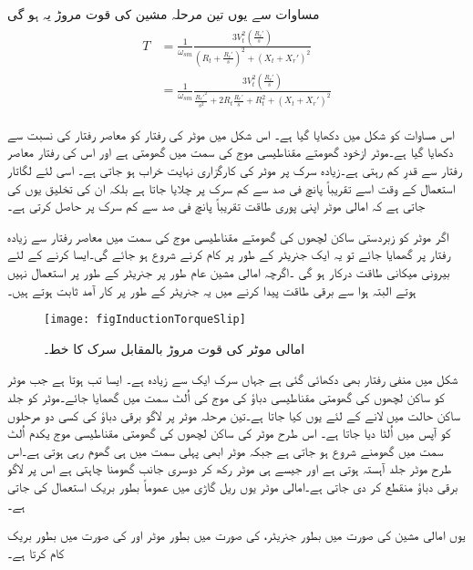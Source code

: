 مساوات   سے یوں تین مرحلہ مشین کی قوت مروڑ یہ ہو گی
\begin{gather}
\begin{aligned}\label{مساوات_امالی_تین_دور_مروڑ_الف}
T&=\frac{1}{\omega_{sm}} \frac{3 V_t^2 \left(\frac{R_r'}{s} \right)}{\left(R_t+\frac{R_r'}{s} \right)^2+\left(X_t+X_r' \right)^2}\\
&=\frac{1}{\omega_{sm}} \frac{3 V_t^2 \left(\frac{R_r'}{s} \right)}{\frac{R_r'^2}{s^2}+2 R_t \frac{R_r'}{s}+R_t^2+\left(X_t+X_r' \right)^2}
\end{aligned}
\end{gather}

اس مساوات کو شکل   میں دکھایا گیا ہے۔ اس شکل میں موٹر کی رفتار کو معاصر رفتار کی نسبت سے دکھایا گیا ہے۔موٹر ازخود گھومتے مقناطیسی موج کی سمت میں گھومتی ہے اور اس کی رفتار معاصر رفتار سے قدرِ کم رہتی ہے۔زیادہ سرک پر موٹر کی کارگزاری نہایت خراب ہو جاتی ہے۔ اسی لئے  لگاتار استعمال کے وقت اسے تقریباً پانچ فی صد سے کم سرک پر چلایا جاتا ہے بلکہ ان کی تخلیق یوں کی جاتی ہے کہ امالی موٹر اپنی پوری طاقت تقریباً پانچ فی صد سے کم سرک پر حاصل کرتی ہے۔ 

اگر موٹر کو زبردستی ساکن لچھوں کی گھومتے مقناطیسی موج کی سمت میں معاصر رفتار سے زیادہ رفتار پر گھمایا جائے تو یہ ایک جنریٹر کے طور پر کام کرنے شروع ہو جائے گی۔ایسا کرنے کے لئے بیرونی میکانی طاقت درکار ہو گی ۔اگرچہ امالی مشین عام طور پر جنریٹر کے طور پر استعمال نہیں ہوتے البتہ ہوا سے برقی طاقت پیدا کرنے میں یہ جنریٹر کے طور پر کار آمد ثابت ہوتے ہیں۔
\begin{figure}
\centering
\texttt{[image: figInductionTorqueSlip]}
\caption{امالی موٹر کی قوت مروڑ بالمقابل سرک کا خط۔}
\label{شکل_امالی_مروڑ_بالمقابل_رفتار}
\end{figure}

شکل  میں منفی رفتار بھی دکھائی گئی ہے جہاں سرک ایک سے زیادہ ہے۔ ایسا تب ہوتا ہے جب موٹر کو ساکن لچھوں کی گھومتی مقناطیسی دباؤ کی موج کی اُلٹ سمت میں گھمایا جائے۔موٹر کو جلد ساکن حالت میں لانے کے لئے یوں کیا جاتا ہے۔تین مرحلہ موٹر پر لاگو برقی دباؤ کی کسی دو مرحلوں کو آپس میں اُلٹا دیا جاتا ہے۔ اس طرح موٹر کی ساکن لچھوں کی گھومتی مقناطیسی موج یکدم اُلٹ سمت میں گھومنے شروع ہو جاتی ہے جبکہ موٹر ابھی پہلی سمت میں ہی گھوم رہی ہوتی ہے۔اس طرح موٹر جلد آہستہ ہوتی ہے اور جیسے ہی موٹر رکھ کر دوسری جانب گھومنا چاہتی ہے اس پر لاگو برقی دباؤ منقطع کر دی جاتی ہے۔امالی موٹر یوں ریل  گاڑی میں عموماً بطور بریک استعمال کی جاتی ہے۔

یوں امالی مشین  کی صورت میں بطور جنریٹر،  کی صورت میں بطور موٹر اور  کی صورت میں بطور بریک کام کرتا ہے۔

